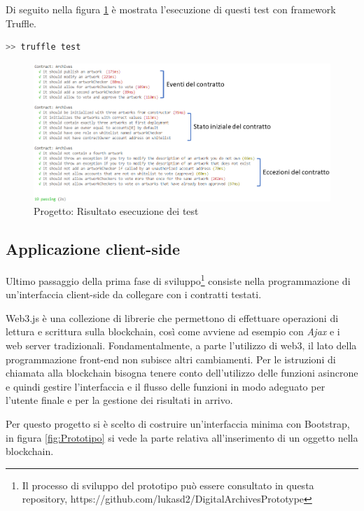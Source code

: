 Di seguito nella figura \ref{fig:contractTests} è mostrata l'esecuzione di questi test con framework Truffle.
\\
\begin{lstlisting}[caption={Truffle esecuzione di test},language=JavaScript]
>> truffle test
\end{lstlisting}

\begin{figure}[H]
\centering
\includegraphics[width=1\textwidth]{immagini/testContratti.png}
\caption{Progetto: Risultato esecuzione dei test}
\label{fig:contractTests}
\end{figure}

\subsection{Applicazione client-side}

Ultimo passaggio della prima fase di sviluppo\footnote{Il processo di sviluppo del prototipo può essere consultato in questa repository, https://github.com/lukasd2/DigitalArchivesPrototype} consiste nella programmazione di un'interfaccia client-side da collegare con i contratti testati.

Web3.js è una collezione di librerie che permettono di effettuare operazioni di lettura e scrittura sulla blockchain, così come avviene ad esempio con \emph{Ajax} e i web server tradizionali. Fondamentalmente, a parte l’utilizzo di web3, il lato della programmazione front-end non subisce altri cambiamenti. Per le istruzioni di chiamata alla blockchain bisogna tenere conto dell’utilizzo delle funzioni asincrone e quindi gestire l’interfaccia e il flusso delle funzioni in modo adeguato per l’utente finale e per la gestione dei risultati in arrivo.

Per questo progetto si è scelto di costruire un'interfaccia minima con Bootstrap, in figura \ref{fig:Prototipo} si vede la parte relativa all'inserimento di un oggetto nella blockchain. 

